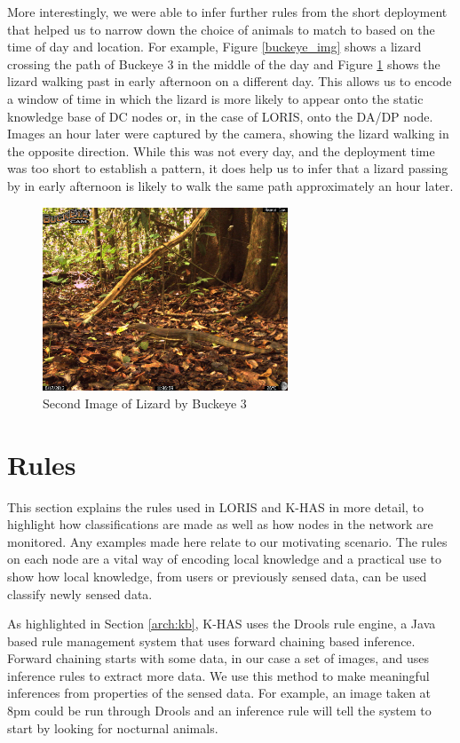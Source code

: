 		More interestingly, we were able to infer further rules from the short deployment that helped us to narrow down the choice of animals to match to based on the time of day and location. For example, Figure \ref{buckeye_img} shows a lizard crossing the path of Buckeye 3 in the middle of the day and Figure \ref{buckeye_img_2} shows the lizard walking past in early afternoon on a different day. This allows us to encode a window of time  in which the lizard is more likely to appear onto the static knowledge base of DC nodes or, in the case of LORIS, onto the DA/DP node. Images an hour later were captured by the camera, showing the lizard walking in the opposite direction. While this was not every day, and the deployment time was too short to establish a pattern, it does help us to infer that a lizard passing by in early afternoon is likely to walk the same path approximately an hour later.
		
		    \begin{figure}[h]
		    \centering
			\includegraphics[width=0.65\textwidth]{Chap6/figures/buckeye_img_2}
		    \caption{Second Image of Lizard by Buckeye 3}
		    \label{buckeye_img_2}
		    \end{figure}
	
	\section{Rules}
		This section explains the rules used in LORIS and K-HAS in more detail, to highlight how classifications are made as well as how nodes in the network are monitored. Any examples made here relate to our motivating scenario. The rules on each node are a vital way of encoding local knowledge and a practical use to show how local knowledge, from users or previously sensed data, can be used classify newly sensed data.
		
		As highlighted in Section \ref{arch:kb}, K-HAS uses the Drools rule engine, a Java based rule management system that uses forward chaining based inference. Forward chaining starts with some data, in our case a set of images, and uses inference rules to extract more data. We use this method to make meaningful inferences from properties of the sensed data. For example, an image taken at 8pm could be run through Drools and an inference rule will tell the system to start by looking for nocturnal animals.
		
